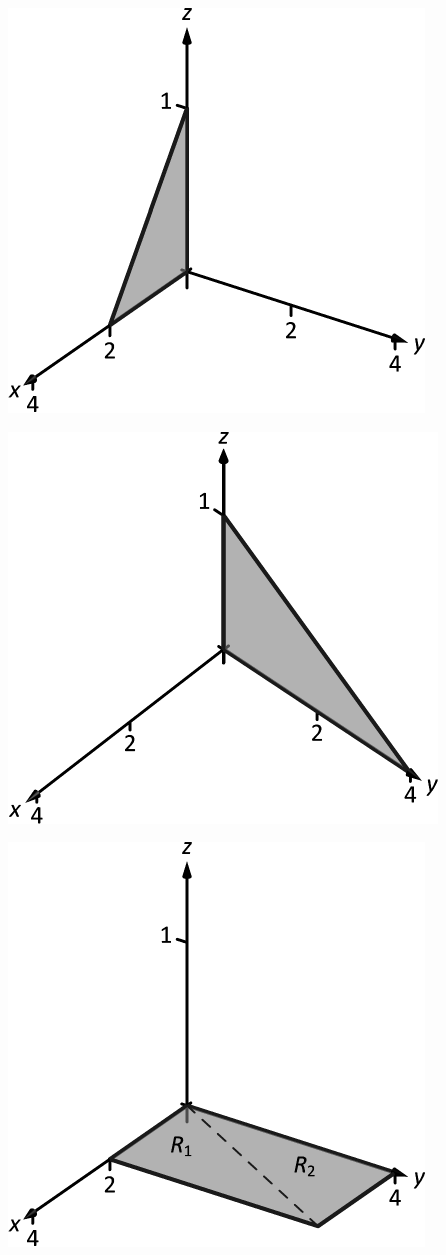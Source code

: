 \documentclass[10pt]{article}
\begin{document}
\includegraphics{figtrip4b_3DBW.pdf}
\texttt{}

\includegraphics{figtrip4c_3DBW.pdf}
\texttt{}

\includegraphics{figtrip4d_3DBW.pdf}
\texttt{}
\end{document}
